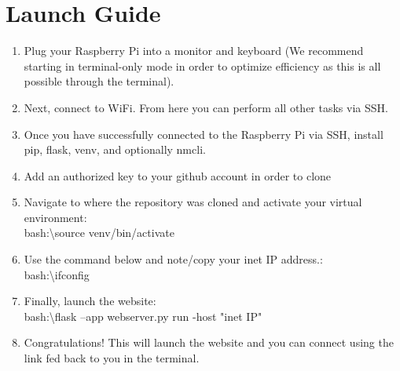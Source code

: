\documentclass[journal]{IEEEtran}
\newcommand{\MYhref}[3][blue]{\href{#2}{\color{#1}{#3}}}%
\begin{document}
\section{Launch Guide}
\begin{enumerate}

\item Plug your Raspberry Pi into a monitor and keyboard (We recommend starting in terminal-only mode in order to optimize efficiency as this is all possible through the terminal).

\item Next, connect to WiFi. From here you can perform all other tasks via SSH.

\item Once you have successfully connected to the Raspberry Pi via SSH, install pip, flask, venv, and optionally nmcli.  
\item Add an authorized key to your github account in order to clone \MYhref{https://github.com/Leo-Berman/Treadmill-To-Walking-Pad.git}{this GitHub Repository}

\item Navigate to where the repository was cloned and activate your virtual environment:\\ bash:\textbackslash\textdollar\space source venv/bin/activate

\item Use the command below and note/copy your inet IP address.:\\
bash:\textbackslash\textdollar\space ifconfig


\item Finally, launch the website:\\
bash:\textbackslash\textdollar\space flask --app webserver.py run -host "inet IP"

\item Congratulations! This will launch the website and you can connect using the link fed back to you in the terminal.

\end{enumerate}
\end{document}
